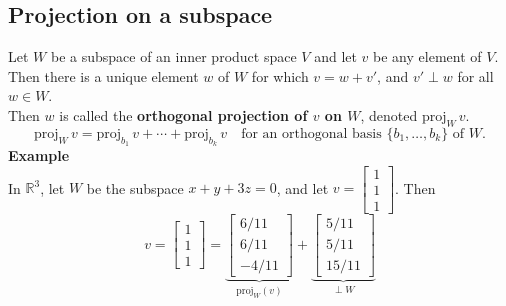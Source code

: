 \documentclass[a4paper, 9pt]{extarticle}
\begin{document}
\subsection{Projection on a subspace}
Let $W$ be a subspace of an inner product space $V$ and let $v$ be any element of $V$.\\
Then there is a unique element $w$ of $W$ for which
$v = w + v'$, and $v' \perp w$ for all $w \in W$. \\[2ex]
Then $w$ is called the \textbf{orthogonal projection of $v$ on $W$}, denoted $\text{proj}_W\,v$.
$$
  \text{proj}_W\,v = \text{proj}_{b_1}\,v + \cdots + \text{proj}_{b_k}\,v \quad \text{for an orthogonal basis } \{b_1, \dots, b_k\} \text{ of } W.
$$
\textbf{Example} \\
In $\mathbb{R}^3$, let $W$ be the subspace $x + y + 3z = 0$, and let $v = \begin{bmatrix} 1 \\ 1 \\ 1 \end{bmatrix}$.
Then
$$
  v = \begin{bmatrix} 1 \\ 1 \\ 1 \end{bmatrix}
  = \underbrace{\begin{bmatrix} 6/11 \\ 6/11 \\ -4/11 \end{bmatrix}}_{\text{proj}_W(v)}
  + \underbrace{\begin{bmatrix} 5/11 \\ 5/11 \\ 15/11 \end{bmatrix}}_{\perp W}
$$
\end{document}
